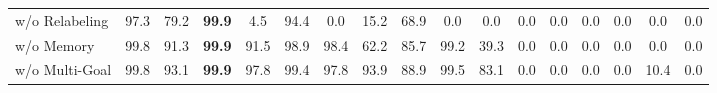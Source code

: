 \begin{table}[ht]
{\begin{tabular}{@{}lcccccccccccccccc@{}}
w/o Relabeling       & 97.3                                                    & 79.2                                                     & \textbf{99.9}                                          & 4.5                                                & 94.4                                                   & 0.0                                                   & 15.2                                               & 68.9                                                     & 0.0                                                     & 0.0                                                      & 0.0                                                      & 0.0                                                      & 0.0                                                    & 0.0                                                     & 0.0                                                        & 0.0                                                              \\
w/o Memory           & 99.8                                                    & 91.3                                                     & \textbf{99.9}                                          & 91.5                                               & 98.9                                                   & 98.4                                                  & 62.2                                               & 85.7                                                     & 99.2                                                    & 39.3                                                     & 0.0                                                      & 0.0                                                      & 0.0                                                    & 0.0                                                     & 0.0                                                        & 0.0                                                              \\
w/o Multi-Goal       & 99.8                                                    & 93.1                                                     & \textbf{99.9}                                          & 97.8                                               & 99.4                                                   & 97.8                                                  & 93.9                                               & 88.9                                                     & 99.5                                                    & 83.1                                                     & 0.0                                                      & 0.0                                                      & 0.0                                                    & 0.0                                                     & 10.4                                                       & 0.0                                                              \\

\end{tabular}}
\end{table}
